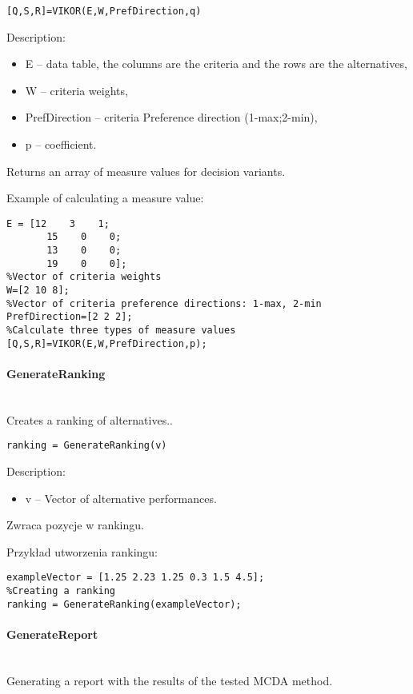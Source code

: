 \begin{lstlisting}[style=Matlab-editor]
[Q,S,R]=VIKOR(E,W,PrefDirection,q)
\end{lstlisting}

Description:
\begin{itemize}
\item  E -- data table, the columns are the criteria and the rows are the alternatives,
\item  W -- criteria weights,
\item  PrefDirection -- criteria Preference direction (1-max;2-min),
\item  p -- coefficient.
\end{itemize}

Returns an array of measure values for decision variants.

Example of calculating a measure value:
\begin{lstlisting}[style=Matlab-editor]
%Data table
E = [12    3    1;
       15    0    0;
       13    0    0;
       19    0    0];
%Vector of criteria weights
W=[2 10 8];
%Vector of criteria preference directions: 1-max, 2-min
PrefDirection=[2 2 2];
%Calculate three types of measure values
[Q,S,R]=VIKOR(E,W,PrefDirection,p);
\end{lstlisting}


\paragraph{GenerateRanking} \hspace{0pt} \\
Creates a ranking of alternatives..

\begin{lstlisting}[style=Matlab-editor]
ranking = GenerateRanking(v)
\end{lstlisting}

Description:
\begin{itemize}
\item  v -- Vector of alternative performances.
\end{itemize}

Zwraca pozycje w rankingu.

Przykład utworzenia rankingu:
\begin{lstlisting}[style=Matlab-editor]
%Example vector
exampleVector = [1.25 2.23 1.25 0.3 1.5 4.5];
%Creating a ranking
ranking = GenerateRanking(exampleVector);
\end{lstlisting}

\paragraph{GenerateReport} \hspace{0pt} \\
Generating a report with the results of the tested MCDA method.

